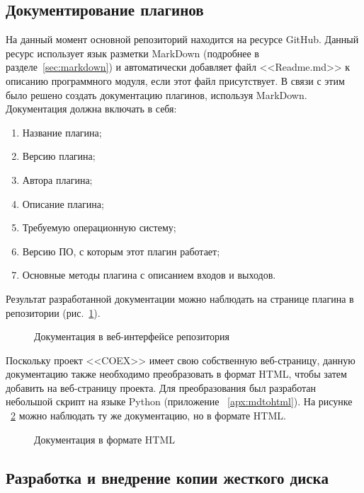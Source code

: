 \subsection{Документирование плагинов}

На данный момент основной репозиторий находится на ресурсе GitHub. Данный ресурс использует язык разметки MarkDown (подробнее в разделе~\ref{sec:markdown}) и автоматически добавляет файл <<Readme.md>> к описанию программного модуля, если этот файл присутствует. В связи с этим было решено создать документацию плагинов, используя MarkDown. Документация должна включать в себя:

\begin{enumerate}
  \item Название плагина;
  \item Версию плагина;
  \item Автора плагина;
  \item Описание плагина;
  \item Требуемую операционную систему;
  \item Версию ПО, с которым этот плагин работает;
  \item Основные методы плагина с описанием входов и выходов.
\end{enumerate}

Результат разработанной документации можно наблюдать на странице плагина в репозитории (рис.~\ref{bok_1:bok_1}).

\begin{figure}[h!]
\caption{ Документация в веб-интерфейсе репозитория }
\label{bok_1:bok_1}
\end{figure}

Поскольку проект <<COEX>> имеет свою собственную веб-страницу, данную документацию также необходимо преобразовать в формат HTML, чтобы затем добавить на веб-страницу проекта. Для преобразования был разработан небольшой скрипт на языке Python (приложение ~\ref{apx:mdtohtml}). На рисунке ~\ref{bok_2:bok_2} можно наблюдать ту же документацию, но в формате HTML.

\begin{figure}[h!]
\caption{ Документация в формате HTML }
\label{bok_2:bok_2}
\end{figure}

\clearpage
\subsection{Разработка и внедрение копии жесткого диска}

